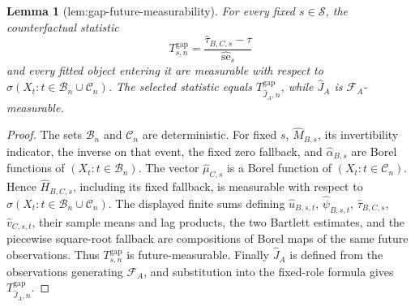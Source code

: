 \documentclass{article}
\newtheorem{lemma}{Lemma}
\begin{document}
\begin{lemma}[lem:gap-future-measurability]\label{lem:gap-future-measurability}
For every fixed \(s\in\mathcal S\), the counterfactual statistic
\[
 T_{s,n}^{\mathrm{gap}}
 =\frac{\widehat\tau_{B,C,s}-\tau}
        {\widehat{\operatorname{se}}_s}
\]
and every fitted object entering it are measurable with respect to \(\sigma(X_t:t\in\mathcal B_n\cup\mathcal C_n)\).  The selected statistic equals \(T_{\widehat J_A,n}^{\mathrm{gap}}\), while \(\widehat J_A\) is \(\mathcal F_A\)-measurable.
\end{lemma}
\begin{proof}
The sets \(\mathcal B_n\) and \(\mathcal C_n\) are deterministic.  For fixed \(s\), \(\widehat M_{B,s}\), its invertibility indicator, the inverse on that event, the fixed zero fallback, and \(\widehat\alpha_{B,s}\) are Borel functions of \((X_t:t\in\mathcal B_n)\).  The vector \(\widehat\mu_{C,s}\) is a Borel function of \((X_t:t\in\mathcal C_n)\).  Hence \(\widehat H_{B,C,s}\), including its fixed fallback, is measurable with respect to \(\sigma(X_t:t\in\mathcal B_n\cup\mathcal C_n)\).  The displayed finite sums defining \(\widehat u_{B,s,t}\), \(\widehat\psi_{B,s,t}\), \(\widehat\tau_{B,C,s}\), \(\widehat v_{C,s,t}\), their sample means and lag products, the two Bartlett estimates, and the piecewise square-root fallback are compositions of Borel maps of the same future observations.  Thus \(T_{s,n}^{\mathrm{gap}}\) is future-measurable.  Finally \(\widehat J_A\) is defined from the observations generating \(\mathcal F_A\), and substitution into the fixed-role formula gives \(T_{\widehat J_A,n}^{\mathrm{gap}}\).
\end{proof}
\end{document}
